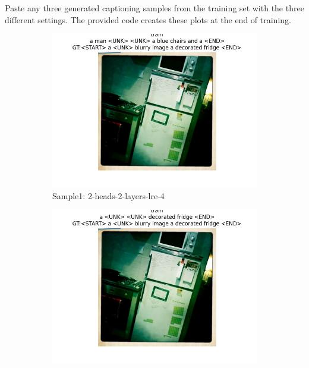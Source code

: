 \documentclass[11pt,addpoints,answers]{exam}
\begin{document}
\begin{questions}
\begin{figure}[H]
\end{figure}
\question Paste any three generated captioning samples from the training set with the three different settings. The provided code creates these plots at the end of training.
\\
\begin{figure}[H]
    \centering
    \begin{subfigure}[b]{0.32\linewidth}
        \includegraphics[width=\linewidth]{case1_train_3.png}
        \caption{Sample1: 2-heads-2-layers-lre-4}
    \end{subfigure}
    \begin{subfigure}[b]{0.32\linewidth}
        \includegraphics[width=\linewidth]{case2_train_3.png}

\end{subfigure}
\end{figure}
\end{questions}
\end{document}
